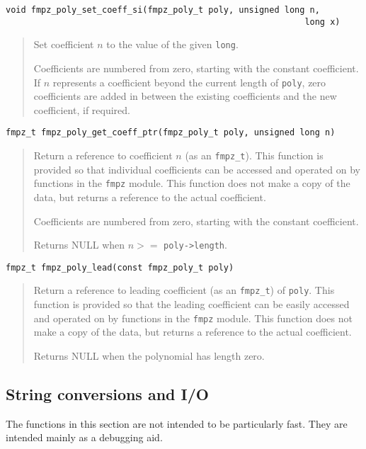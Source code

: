 \documentclass[a4paper,10pt]{article}
\newcommand{\code}{\lstinline}
\begin{document}
\begin{lstlisting}
void fmpz_poly_set_coeff_si(fmpz_poly_t poly, unsigned long n, 
                                                           long x) 
\end{lstlisting}
\begin{quote}
Set coefficient $n$ to the value of the given \code{long}. 

Coefficients are numbered from zero, starting with the constant coefficient. If $n$ represents a coefficient beyond the current length of \code{poly}, zero coefficients are added in between the existing coefficients and the new coefficient, if required.
\end{quote}

\begin{lstlisting}
fmpz_t fmpz_poly_get_coeff_ptr(fmpz_poly_t poly, unsigned long n)
\end{lstlisting}
\begin{quote}
Return a reference to coefficient $n$ (as an \code{fmpz_t}). This function is provided so that individual coefficients can be accessed and operated on by functions in the \code{fmpz} module. This function does not make a copy of the data, but returns a reference to the actual coefficient.

Coefficients are numbered from zero, starting with the constant coefficient. 

Returns NULL when $n >= $ \code{poly->length}. 
\end{quote}

\begin{lstlisting}
fmpz_t fmpz_poly_lead(const fmpz_poly_t poly)
\end{lstlisting}
\begin{quote}
Return a reference to leading coefficient (as an \code{fmpz_t}) of \code{poly}. This function is provided so that the leading coefficient can be easily accessed and operated on by functions in the \code{fmpz} module. This function does not make a copy of the data, but returns a reference to the actual coefficient.

Returns NULL when the polynomial has length zero. 
\end{quote}

\subsection{String conversions and I/O}

The functions in this section are not intended to be particularly fast. They are intended mainly as a debugging aid.
\end{document}
